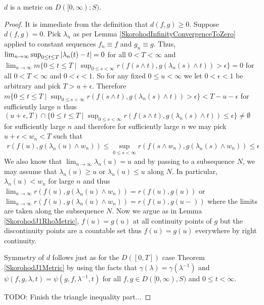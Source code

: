 \begin{prop}$d$ is a metric on $D([0,\infty); S)$.
\end{prop}
\begin{proof}
It is immediate from the definition that $d(f,g) \geq 0$.  Suppose $d(f,g) = 0$.  Pick $\lambda_n$ as per Lemma \ref{SkorohodInfinityConvergenceToZero} applied to constant sequences $f_n \equiv f$ and $g_n \equiv g$.  Thus,
$\lim_{n \to \infty}   \sup_{0 \leq t \leq T} \left \vert \lambda_n(t) - t \right \vert = 0$ for all $0 < T < \infty$ and $\lim_{n \to \infty} m \lbrace 0 \leq t \leq T \mid \sup_{0 \leq s < \infty} r(f(s \wedge t), g(\lambda_n(s) \wedge t)) > \epsilon \rbrace = 0$ for all $0 < T < \infty$ and $0 < \epsilon < 1$.  So for any fixed $0 \leq u < \infty$ we let $0 < \epsilon < 1$ be arbitrary and
pick $T > u+\epsilon$. 
Therefore $m \lbrace 0 \leq t \leq T \mid \sup_{0 \leq s < \infty} r(f(s \wedge t), g(\lambda_n(s) \wedge t)) > \epsilon \rbrace < T -u-\epsilon$ for sufficiently large $n$ thus 
$(u+\epsilon,T) \cap \lbrace 0 \leq t \leq T \mid \sup_{0 \leq s < \infty} r(f(s \wedge t), g(\lambda_n(s) \wedge t)) \leq \epsilon \rbrace \neq \emptyset$ for sufficiently large $n$  
and therefore for sufficiently large $n$ we may pick $u+\epsilon < w_n < T$ such that
\begin{align*}
r(f(u), g(\lambda_n(u) \wedge w_n)) \leq \sup_{0 \leq s < \infty} r(f(s \wedge w_n), g(\lambda_n(s) \wedge w_n)) \leq \epsilon
\end{align*}
We also know that $\lim_{n \to \infty} \lambda_n(u) = u$ and by passing to a subsequence $N$, we may assume that $\lambda_n(u) \geq u$ or $\lambda_n(u) \leq u$ along $N$. 
In particular, $\lambda_n(u) < w_n$ for large $n$ and thus $\lim_{n \to \infty} r(f(u), g(\lambda_n(u) \wedge w_n)) = r(f(u), g(u))$ or $\lim_{n \to \infty} r(f(u), g(\lambda_n(u) \wedge w_n)) = r(f(u), g(u-))$ where the limits are taken along the subsequence $N$.  Now we argue as in Lemma \ref{SkorohodJ1RhoMetric},  $f(u) = g(u)$ at all continuity points of $g$ but the discontinuity points are a countable set thus $f(u) = g(u)$ everywhere by right continuity.

Symmetry of $d$ follows just as for the $D([0,T])$ case Theorem \ref{SkorohodJ1Metric} by using the facts that $\gamma(\lambda) = \gamma(\lambda^{-1})$ and $\psi(f,g,\lambda,t) = \psi(g,f,\lambda^{-1},t)$ for all $f,g \in D([0,\infty),S)$ and $0 \leq t < \infty$.

TODO: Finish the triangle inequality part...
\end{proof}

